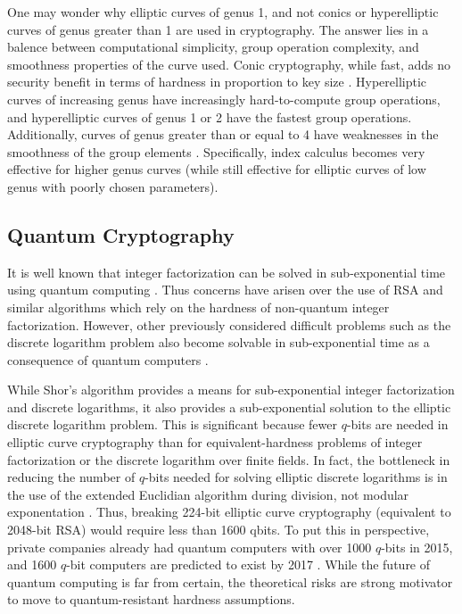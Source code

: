 \documentclass{article}
\begin{document}
One may wonder why elliptic curves of genus 1, and not conics or hyperelliptic
curves of genus greater than 1 are used in cryptography. The answer lies in a
balence between computational simplicity, group operation complexity, and
smoothness properties of the curve used. Conic cryptography, while fast, adds
no security benefit in terms of hardness in proportion to key size
\cite{Menezes1992}. Hyperelliptic curves of increasing genus have increasingly
hard-to-compute group operations, and hyperelliptic curves of genus 1 or 2 have
the fastest group operations. Additionally, curves of genus greater than or
equal to 4 have weaknesses in the smoothness of the group elements
\cite{Costello2012} \cite{Gaudry2000}. Specifically, index calculus becomes
very effective for higher genus curves (while still effective for elliptic
curves of low genus with poorly chosen parameters).


\subsection{Quantum Cryptography}
It is well known that integer factorization can be solved in sub-exponential
time using quantum computing \cite{quant_fac} \cite{shor_fac}. Thus concerns
have arisen over the use of RSA and similar algorithms which rely on the
hardness of non-quantum integer factorization. However, other previously
considered difficult problems such as the discrete logarithm problem also
become solvable in sub-exponential time as a consequence of quantum computers
\cite{bern_quant} \cite{shor}.

While Shor's algorithm provides a means for sub-exponential integer
factorization and discrete logarithms, it also provides a sub-exponential
solution to the elliptic discrete logarithm problem. This is significant
because fewer $q$-bits are needed in elliptic curve cryptography than for
equivalent-hardness problems of integer factorization or the discrete logarithm
over finite fields. In fact, the bottleneck in reducing the number of $q$-bits
needed for solving elliptic discrete logarithms is in the use of the extended
Euclidian algorithm during division, not modular exponentation \cite{proos}.
Thus, breaking 224-bit elliptic curve cryptography (equivalent to 2048-bit RSA)
would require less than 1600 qbits. To put this in perspective, private
companies already had quantum computers with over 1000 $q$-bits \cite{dwave} in
2015, and 1600 $q$-bit computers are predicted to exist by 2017 \cite{pq}.
While the future of quantum computing is far from certain, the theoretical
risks are strong motivator to move to quantum-resistant hardness assumptions.
\end{document}
